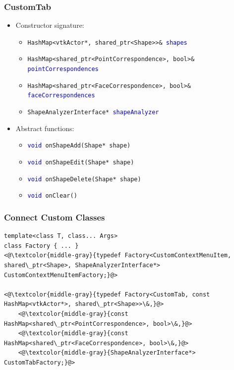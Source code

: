 \documentclass[compress]{beamer}
\begin{document}
\begin{frame}
	\frametitle{CustomTab}
	
	\begin{itemize}
		\item Constructor signature:
		\begin{itemize}
			\item \texttt{HashMap<vtkActor*, shared\_ptr<Shape>>\& \textcolor{blue}{shapes}}
			\item \texttt{HashMap<shared\_ptr<PointCorrespondence>, bool>\& \textcolor{blue}{pointCorrespondences}}
			\item \texttt{HashMap<shared\_ptr<FaceCorrespondence>, bool>\& \textcolor{blue}{faceCorrespondences}}
			\item \texttt{ShapeAnalyzerInterface* \textcolor{blue}{shapeAnalyzer}}
		\end{itemize}
		\item Abstract functions:
		\begin{itemize}
			\item \texttt{\textcolor{blue}{void} onShapeAdd(Shape* shape)}
			\item \texttt{\textcolor{blue}{void} onShapeEdit(Shape* shape)}
			\item \texttt{\textcolor{blue}{void} onShapeDelete(Shape* shape)}
			\item \texttt{\textcolor{blue}{void} onClear()}
		\end{itemize}
	\end{itemize}
\end{frame}

\begin{frame}[fragile]
\frametitle{Connect Custom Classes}

\begin{lstlisting}
template<class T, class... Args>
class Factory { ... }
<@\textcolor{middle-gray}{typedef Factory<CustomContextMenuItem, shared\_ptr<Shape>, ShapeAnalyzerInterface*> CustomContextMenuItemFactory;}@>

<@\textcolor{middle-gray}{typedef Factory<CustomTab, const HashMap<vtkActor*>, shared\_ptr<Shape>>\&,}@>
    <@\textcolor{middle-gray}{const HashMap<shared\_ptr<PointCorrespondence>, bool>\&,}@>
    <@\textcolor{middle-gray}{const HashMap<shared\_ptr<FaceCorrespondence>, bool>\&,}@>
    <@\textcolor{middle-gray}{ShapeAnalyzerInterface*> CustomTabFactory;}@>
\end{lstlisting}

\end{frame}
\end{document}
